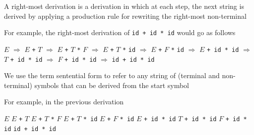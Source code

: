 \documentclass[8pt,a4paper,compress]{beamer}
\newcommand{\mm}[1]{$#1$}
\newenvironment{spaced}
{
\smallskip
\hspace{.5cm}
\begin{minipage}[c]{\textwidth}
}
{
\end{minipage}
\smallskip
}
\begin{document}
\begin{frame}[fragile]
\pause

A right-most derivation is a derivation in which at each step, the next string is derived by applying a production rule for rewriting the right-most non-terminal

\pause
\bigskip

For example, the right-most derivation of \lstinline{id + id * id} would go as follows

\text{ }
\begin{spaced}
\begin{production}
\underline{\mm{E}} \mm{\Rightarrow} \mm{E} \lstinline{+} \underline{\mm{T}}
   \mm{\Rightarrow} \mm{E} \lstinline{+} \mm{T} \lstinline{*} \underline{\mm{F}}
   \mm{\Rightarrow} \mm{E} \lstinline{+} \underline{\mm{T}} \lstinline{*} \lstinline{id}
   \mm{\Rightarrow} \mm{E} \lstinline{+} \underline{\mm{F}} \lstinline{*} \lstinline{id}
   \mm{\Rightarrow} \underline{\mm{E}} \lstinline{+ id * id}
   \mm{\Rightarrow} \underline{\mm{T}} \lstinline{+ id * id}
   \mm{\Rightarrow} \underline{\mm{F}} \lstinline{+ id * id}
   \mm{\Rightarrow} \lstinline{id + id * id}
\end{production}
\end{spaced}

\pause

We use the term sentential form to refer to any string of (terminal and non-terminal) symbols that can be derived from the start symbol

\pause
\bigskip

For example, in the previous derivation

\text{ }
\begin{spaced}
\begin{production}
\mm{E}
\mm{E} \lstinline{+} \mm{T}
\mm{E} \lstinline{+} \mm{T} \lstinline{*} \mm{F}
\mm{E} \lstinline{+} \mm{T} \lstinline{* id}
\mm{E} \lstinline{+} \mm{F} \lstinline{* id}
\mm{E} \lstinline{+ id * id}
\mm{T} \lstinline{+ id * id}
\mm{F} \lstinline{+ id * id}
\lstinline{id + id * id}
\end{production}
\end{spaced}
\end{frame}
\end{document}
